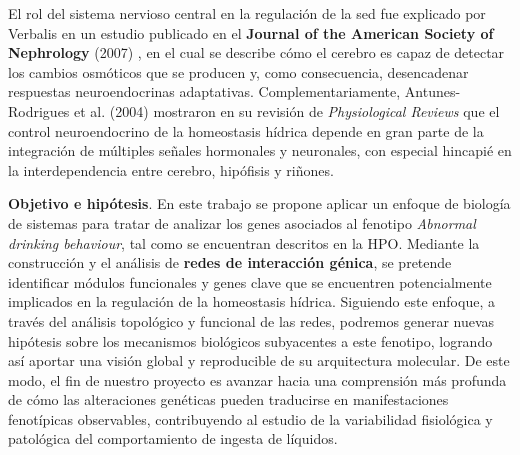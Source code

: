 El rol del sistema nervioso central en la regulación de la sed fue explicado por Verbalis en un estudio publicado en el \textbf{Journal of the American Society of Nephrology} (2007) \cite{verbalis2007brain}, en el cual se describe cómo el cerebro es capaz de detectar los cambios osmóticos que se producen y, como consecuencia, desencadenar respuestas neuroendocrinas adaptativas. Complementariamente, Antunes-Rodrigues et al. (2004) \cite{antunes2004neuroendocrine} mostraron en su revisión de \textit{Physiological Reviews} que el control neuroendocrino de la homeostasis hídrica depende en gran parte de la integración de múltiples señales hormonales y neuronales, con especial hincapié en la interdependencia entre cerebro, hipófisis y riñones.

\textbf{Objetivo e hipótesis}. En este trabajo se propone aplicar un enfoque de biología de sistemas para tratar de analizar los genes asociados al fenotipo \textit{Abnormal drinking behaviour}, tal como se encuentran descritos en la HPO. Mediante la construcción y el análisis de \textbf{redes de interacción génica}, se pretende identificar módulos funcionales y genes clave que se encuentren potencialmente implicados en la regulación de la homeostasis hídrica. Siguiendo este enfoque, a través del análisis topológico y funcional de las redes, podremos generar nuevas hipótesis sobre los mecanismos biológicos subyacentes a este fenotipo, logrando así aportar una visión global y reproducible de su arquitectura molecular. De este modo, el fin de nuestro proyecto es avanzar hacia una comprensión más profunda de cómo las alteraciones genéticas pueden traducirse en manifestaciones fenotípicas observables, contribuyendo al estudio de la variabilidad fisiológica y patológica del comportamiento de ingesta de líquidos.
